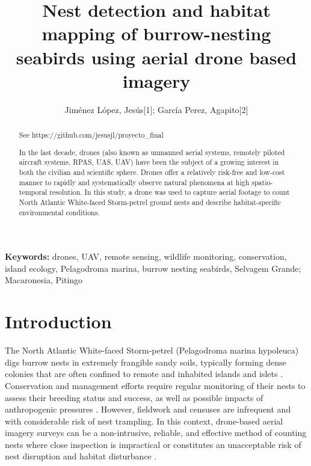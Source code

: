 \documentclass[12pt]{article}
\begin{document}
\title{Nest detection and habitat mapping of burrow-nesting seabirds using aerial drone based imagery}

\author{Jiménez López, Jesús[1]; García Perez, Agapito[2]}


\maketitle
\begin{abstract}
	
See https://github.com/jesusjl/proyecto\_final

In the last decade, drones (also known as unmanned aerial systems, remotely piloted aircraft systems, RPAS, UAS, UAV) have been the subject of a growing interest in both the civilian and scientific sphere. Drones offer a relatively risk-free and low-cost manner to rapidly and systematically observe natural phenomena at high spatio-temporal resolution. In this study, a drone was used to capture aerial footage to count North Atlantic White-faced Storm-petrel ground nests and describe habitat-specific environmental conditions.

\end{abstract}

{\bf Keywords:} drones, UAV, remote sensing, wildlife monitoring, conservation, island ecology, Pelagodroma marina, burrow nesting seabirds, Selvagem Grande; Macaronesia, Pitingo

\section{Introduction}

The North Atlantic White-faced Storm-petrel (Pelagodroma marina hypoleuca) digs burrow nests in extremely frangible sandy soils, typically forming dense colonies that are often confined to remote and inhabited islands and islets \cite{miguel_pessanha_pais_aquasig_2020}. Conservation and management efforts require regular monitoring of their nests to assess their breeding status and success, as well as possible impacts of anthropogenic pressures \cite{ferreira_bottom-up_2015}. However, fieldwork and censuses are infrequent and with considerable risk of nest trampling. In this context, drone-based aerial imagery surveys can be a non-intrusive, reliable, and effective method of counting nests where close inspection is impractical or constitutes an unacceptable risk of nest disruption and habitat disturbance \cite{ventura_mapping_2018}. 
\end{document}
